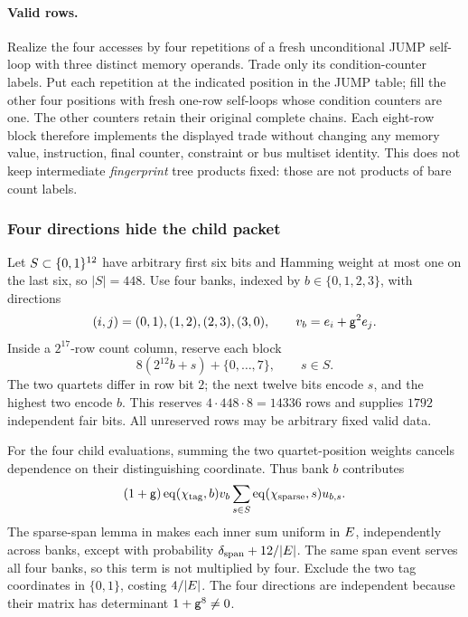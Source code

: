 \paragraph{Valid rows.} Realize the four accesses by four repetitions of a fresh unconditional JUMP self-loop with three distinct memory operands. Trade only its condition-counter labels. Put each repetition at the indicated position in the JUMP table; fill the other four positions with fresh one-row self-loops whose condition counters are one. The other counters retain their original complete chains. Each eight-row block therefore implements the displayed trade without changing any memory value, instruction, final counter, constraint or bus multiset identity. This does not keep intermediate \emph{fingerprint} tree products fixed: those are not products of bare count labels.

\subsubsection{Four directions hide the child packet}

Let $S\subset\{0,1\}^{12}$ have arbitrary first six bits and Hamming weight at most one on the last six, so $|S|=448$. Use four banks, indexed by $b\in\{0,1,2,3\}$, with directions
\[
 (i,j)=(0,1),(1,2),(2,3),(3,0),
 \qquad v_b=e_i+\mathsf{g}^2e_j.
\]
Inside a $2^{17}$-row count column, reserve each block
\[
 8(2^{12}b+s)+\{0,\ldots,7\},\qquad s\in S.
\]
The two quartets differ in row bit $2$; the next twelve bits encode $s$, and the highest two encode $b$. This reserves $4\cdot448\cdot8=14336$ rows and supplies $1792$ independent fair bits. All unreserved rows may be arbitrary fixed valid data.

For the four child evaluations, summing the two quartet-position weights cancels dependence on their distinguishing coordinate. Thus bank $b$ contributes
\[
 (1+\mathsf{g})\operatorname{eq}(\chi_{\mathrm{tag}},b)v_b
 \sum_{s\in S}\operatorname{eq}(\chi_{\mathrm{sparse}},s)u_{b,s}.
\]
The sparse-span lemma in  makes each inner sum uniform in $E$, independently across banks, except with probability $\delta_{\mathrm{span}}+12/|E|$. The same span event serves all four banks, so this term is not multiplied by four. Exclude the two tag coordinates in $\{0,1\}$, costing $4/|E|$. The four directions are independent because their matrix has determinant $1+\mathsf{g}^8\ne0$.

